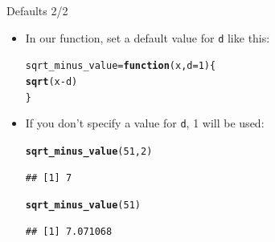 \documentclass[unknownkeysallowed]{beamer}\usepackage[]{graphicx}\usepackage[]{color}
\makeatletter
\newcommand{\hlnum}[1]{\textcolor[rgb]{0.686,0.059,0.569}{#1}}%
\newcommand{\hlopt}[1]{\textcolor[rgb]{0,0,0}{#1}}%
\newcommand{\hlstd}[1]{\textcolor[rgb]{0.345,0.345,0.345}{#1}}%
\newcommand{\hlkwa}[1]{\textcolor[rgb]{0.161,0.373,0.58}{\textbf{#1}}}%
\newcommand{\hlkwb}[1]{\textcolor[rgb]{0.69,0.353,0.396}{#1}}%
\newcommand{\hlkwc}[1]{\textcolor[rgb]{0.333,0.667,0.333}{#1}}%
\newcommand{\hlkwd}[1]{\textcolor[rgb]{0.737,0.353,0.396}{\textbf{#1}}}%
\newenvironment{kframe}{%
 \def\at@end@of@kframe{}%
 \ifinner\ifhmode%
  \def\at@end@of@kframe{\end{minipage}}%
  \begin{minipage}{\columnwidth}%
 \fi\fi%
 \def\FrameCommand##1{\hskip\@totalleftmargin \hskip-\fboxsep
 \colorbox{shadecolor}{##1}\hskip-\fboxsep
     \hskip-\linewidth \hskip-\@totalleftmargin \hskip\columnwidth}%
 \MakeFramed {\advance\hsize-\width
   \@totalleftmargin\z@ \linewidth\hsize
   \@setminipage}}%
 {\par\unskip\endMakeFramed%
 \at@end@of@kframe}
\newenvironment{knitrout}{}{} %
\makeatother
\begin{document}
\begin{frame}[fragile]{Defaults 2/2}
  
  \begin{itemize}
\item In our function, set a default value for \texttt{d} like this:
  
\begin{knitrout}
\color{fgcolor}\begin{kframe}
\begin{alltt}
\hlstd{sqrt_minus_value}\hlkwb{=}\hlkwa{function}\hlstd{(}\hlkwc{x}\hlstd{,}\hlkwc{d}\hlstd{=}\hlnum{1}\hlstd{) \{}
  \hlkwd{sqrt}\hlstd{(x}\hlopt{-}\hlstd{d)}
\hlstd{\}}
\end{alltt}
\end{kframe}
\end{knitrout}
\item If you don't specify a value for \texttt{d}, 1 will be used:
  
\begin{knitrout}
\color{fgcolor}\begin{kframe}
\begin{alltt}
\hlkwd{sqrt_minus_value}\hlstd{(}\hlnum{51}\hlstd{,}\hlnum{2}\hlstd{)}
\end{alltt}
\begin{verbatim}
## [1] 7
\end{verbatim}
\begin{alltt}
\hlkwd{sqrt_minus_value}\hlstd{(}\hlnum{51}\hlstd{)}
\end{alltt}
\begin{verbatim}
## [1] 7.071068
\end{verbatim}
\end{kframe}
\end{knitrout}
  \end{itemize}
  
\end{frame}
\end{document}
